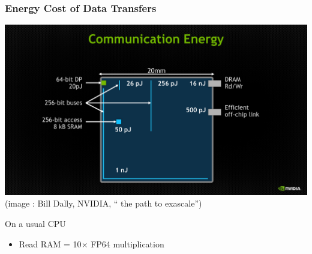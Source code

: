 \documentclass[xcolor={x11names,svgnames}]{beamer}
\begin{document}

\begin{frame}
  \frametitle{Energy Cost of Data Transfers}

  \begin{center}
    \includegraphics[width=\textwidth,clip,trim=0 0 0 3.5cm]{nvidia.pdf}
    \footnotesize (image : Bill Dally, NVIDIA, `` the path to exascale'')
  \end{center}

  \begin{block}{On a usual CPU}
    \begin{itemize}
    \item Read RAM = 10$\times$ FP64 multiplication
    \end{itemize}
  \end{block}
\end{frame}

\end{document}
